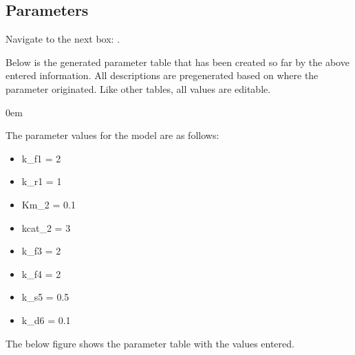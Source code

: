 \documentclass[letterpaper,10pt,english]{sphinxmanual}
\begin{document}
\subsection{Parameters}
\label{\detokenize{pages/tutorial_sc/parameters:parameters}}\label{\detokenize{pages/tutorial_sc/parameters::doc}}
\sphinxAtStartPar
Navigate to the next box: .

\sphinxAtStartPar
Below is the generated parameter table that has been created so far by the
above entered information. All descriptions are pregenerated based on where
the parameter originated. Like other tables, all values are editable.

\begin{figure}[htbp]
\centering

\noindent{}
\end{figure}

\begin{DUlineblock}{0em}
\item[] 
\end{DUlineblock}

\sphinxAtStartPar
The parameter values for the model are as follows:
\begin{itemize}
\item {} 
\sphinxAtStartPar
k\_f1 = 2

\item {} 
\sphinxAtStartPar
k\_r1 = 1

\item {} 
\sphinxAtStartPar
Km\_2 = 0.1

\item {} 
\sphinxAtStartPar
kcat\_2 = 3

\item {} 
\sphinxAtStartPar
k\_f3 = 2

\item {} 
\sphinxAtStartPar
k\_f4 = 2

\item {} 
\sphinxAtStartPar
k\_s5 = 0.5

\item {} 
\sphinxAtStartPar
k\_d6 = 0.1

\end{itemize}

\sphinxAtStartPar
The below figure shows the parameter table with the values entered.

\begin{figure}[htbp]
\centering

\noindent{}
\end{figure}
\end{document}
